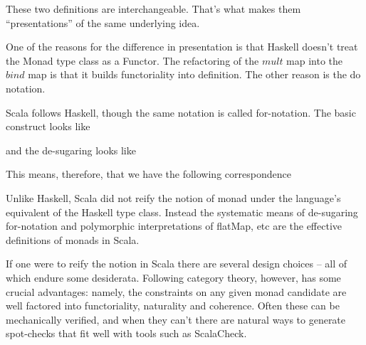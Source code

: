 These two definitions are interchangeable. That's what makes them
``presentations'' of the same underlying idea.

One of the reasons for the difference in presentation is that Haskell
doesn't treat the Monad type class as a Functor. The refactoring of
the $mult$ map into the $bind$ map is that it builds functoriality
into definition. The other reason is the do notation.


 
 
 

Scala follows Haskell, though the same notation is called
for-notation. The basic construct looks like


and the de-sugaring looks like


This means, therefore, that we have the following correspondence


Unlike Haskell, Scala did not reify the notion of monad under the
language's equivalent of the Haskell type class. Instead the
systematic means of de-sugaring for-notation and polymorphic
interpretations of flatMap, etc are the effective definitions of
monads in Scala.

If one were to reify the notion in Scala there are several design
choices -- all of which endure some desiderata. Following category
theory, however, has some crucial advantages: namely, the constraints
on any given monad candidate are well factored into functoriality,
naturality and coherence. Often these can be mechanically verified,
and when they can't there are natural ways to generate spot-checks
that fit well with tools such as ScalaCheck.
